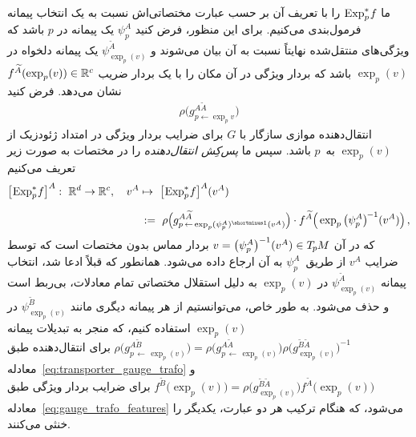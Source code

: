 ما $\operatorname{Exp}^*_p\mkern-2mu f$ را با تعریف آن بر حسب عبارت مختصاتی‌اش نسبت به یک انتخاب پیمانه فرمول‌بندی می‌کنیم.
برای این منظور، فرض کنید $\psi_p^A$ یک پیمانه در $p$ باشد که ویژگی‌های منتقل‌شده نهایتاً نسبت به آن بیان می‌شوند و $\psi_{\exp_p(v)}^{\widetilde{A}}$ یک پیمانه دلخواه در $\exp_p(v)$ باشد که بردار ویژگی در آن مکان را با یک بردار ضریب $f^{\widetilde{A}}(\exp_p(v)) \in \mathbb{R}^c$ نشان می‌دهد.
فرض کنید
\begin{align}
	\rho \big( g^{A\widetilde{A}}_{p\leftarrow\exp_p\!v} \big)
\end{align}
انتقال‌دهنده موازی سازگار با $G$ برای ضرایب بردار ویژگی در امتداد ژئودزیک از $\exp_p(v)$ به~$p$ باشد.
سپس ما \emph{پس‌کِش انتقال‌دهنده} را در مختصات به صورت زیر تعریف می‌کنیم%
\begin{align}\label{eq:transporter_pullback_in_coords}
	\big[\mkern-2mu \Expspf \big]^A:\ \R^d \to \R^c,\quad v^A &\mapsto\ \big[\mkern-2mu \Expspf \big]^A (v^A)
	\notag \\[1.5ex]
	& \,:=\ 
	\rho\pig( g^{A\widetilde{A}}_{p \,\leftarrow\, \exp_p (\psi_p^A)^{\shortminus1}(v^A)} \pig) \cdot
	f^{\widetilde{A}} \pig( \exp_p \big(\psi_p^A\big)^{\mkern-2mu-1}(v^A) \pig) \,,
\end{align}
که در آن $v = \big(\psi_p^A\big)^{-1} (v^A) \in T_{\mkern-1.5mu p}\mkern-.5muM$ بردار مماس بدون مختصات است که توسط ضرایب $v^A$ از طریق~$\psi_p^A$ به آن ارجاع داده می‌شود.
همانطور که قبلاً ادعا شد، انتخاب پیمانه $\psi_{\exp_p(v)}^{\widetilde{A}}$ در $\exp_p(v)$ به دلیل استقلال مختصاتی تمام معادلات، بی‌ربط است و حذف می‌شود.
به طور خاص، می‌توانستیم از هر پیمانه دیگری مانند $\psi_{\exp_p(v)}^{\widetilde{B}}$ در $\exp_p(v)$ استفاده کنیم، که منجر به تبدیلات پیمانه
$
\rho\big( g^{A\widetilde{B}}_{p \,\leftarrow\, \exp_p(v)} \big)
= \rho\big( g^{A\widetilde{A}}_{p \,\leftarrow\, \exp_p(v)} \big)
\rho\big( g_{\exp_p(v)}^{\widetilde{B}\widetilde{A}} \big)^{-1}
$
برای انتقال‌دهنده طبق معادله~\eqref{eq:transporter_gauge_trafo} و
$
f^{\widetilde{B}} \big( \exp_p(v) \big)
= \rho\big( g_{\exp_p(v)}^{\widetilde{B}\widetilde{A}} \big)
f^{\widetilde{A}} \big( \exp_p(v) \big)
$
برای ضرایب بردار ویژگی طبق معادله~\eqref{eq:gauge_trafo_features} می‌شود، که هنگام ترکیب هر دو عبارت، یکدیگر را خنثی می‌کنند.



